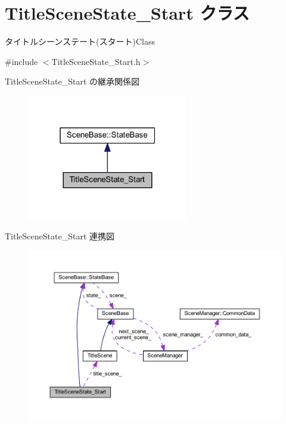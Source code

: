 \hypertarget{class_title_scene_state___start}{}\section{Title\+Scene\+State\+\_\+\+Start クラス}
\label{class_title_scene_state___start}


タイトルシーンステート(スタート)Class  




{\ttfamily \#include $<$Title\+Scene\+State\+\_\+\+Start.\+h$>$}



Title\+Scene\+State\+\_\+\+Start の継承関係図
\nopagebreak
\begin{figure}[H]
\begin{center}
\leavevmode
\includegraphics[width=199pt]{class_title_scene_state___start__inherit__graph}
\end{center}
\end{figure}


Title\+Scene\+State\+\_\+\+Start 連携図
\nopagebreak
\begin{figure}[H]
\begin{center}
\leavevmode
\includegraphics[width=350pt]{class_title_scene_state___start__coll__graph}
\end{center}
\end{figure}
